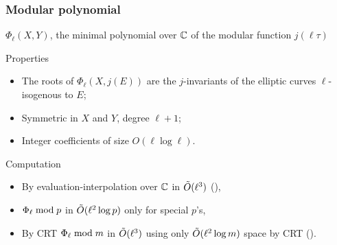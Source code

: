 \documentclass[10pt]{beamer}
\begin{document}

\begin{frame}
  \frametitle{Modular polynomial}

  \begin{center}
    $\Phi_\ell(X,Y)$, the minimal polynomial over $\mathbb{C}$ of the modular
    function $j(\ell\tau)$
  \end{center}

  \begin{block}{Properties}
    \begin{itemize}
    \item The roots of $\Phi_\ell(X,j(E))$ are the $j$-invariants
      of the elliptic curves $\ell$-isogenous to $E$;
    \item Symmetric in $X$ and $Y$, degree $\ell+1$;
    \item Integer coefficients of size $O(\ell\log\ell)$.
    \end{itemize}
  \end{block}

  \begin{block}{Computation}
    \begin{itemize}
    \item By evaluation-interpolation over $\mathbb{C}$ in $\tilde{O}(\ell^3)$  (\cite{enge09}),
    \item $\Phi_\ell\bmod p$ in $\tilde{O}(\ell^2\log p)$ \alert{only
        for special $p$'s},
    \item By CRT $\Phi_\ell\bmod m$ in $\tilde{O}(\ell^3)$ using only
      $\tilde{O}(\ell^2\log m)$ space by CRT (\cite{sutherland10:modpol}).
    \end{itemize}
  \end{block}
\end{frame}

\end{document}
